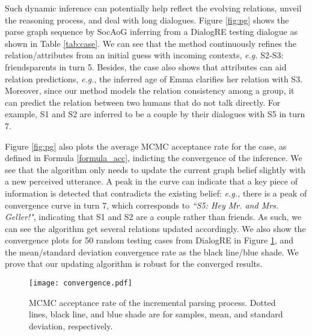 \documentclass[11pt,a4paper]{article}
\begin{document}
Such dynamic inference can potentially help reflect the evolving relations, unveil the reasoning process, and deal with long dialogues.  
Figure \ref{fig:pg} shows the parse graph sequence by SocAoG inferring from a DialogRE testing dialogue as shown in Table \ref{tab:case}. 
We can see that the method continuously refines the relation/attributes from an initial guess with incoming contexts, \textit{e.g.} S2-S3: friendsparents in turn 5.
Besides, the case also shows that attributes can aid relation predictions, \textit{e.g.}, the inferred age of Emma clarifies her relation with S3. 
Moreover, since our method models the relation consistency among a group, it can predict the relation between two humans that do not talk directly. 
For example, S1 and S2 are inferred to be a couple by their dialogues with S5 in turn 7. 

Figure \ref{fig:pg} also plots the average MCMC acceptance rate for the case, as defined in Formula \ref{formula_acc}, indicting the convergence of the inference. 
We see that the algorithm only needs to update the current graph belief slightly with a new perceived utterance. 
A peak in the curve can indicate that a key piece of information is detected that contradicts the existing belief: \textit{e.g.,} there is a peak of convergence curve in turn 7, which corresponds to \textit{``S5: Hey Mr. and Mrs. Geller!"}, indicating that S1 and S2 are a couple rather than friends. 
As such, we can see the algorithm get several relations updated accordingly.
We also show the convergence plots for 50 random testing cases from DialogRE in Figure \ref{fig:sample}, and the mean/standard deviation convergence rate as the black line/blue shade.
We prove that our updating algorithm is robust for the converged results. 
\begin{figure}[ht]
\begin{center}
\centerline{\texttt{[image: convergence.pdf]}}
\caption{MCMC acceptance rate of the incremental parsing process. Dotted lines, black line, and blue shade are for samples, mean, and standard deviation, respectively.}
\label{fig:sample}
\end{center}
\vspace{-4mm}
\end{figure}
\end{document}
